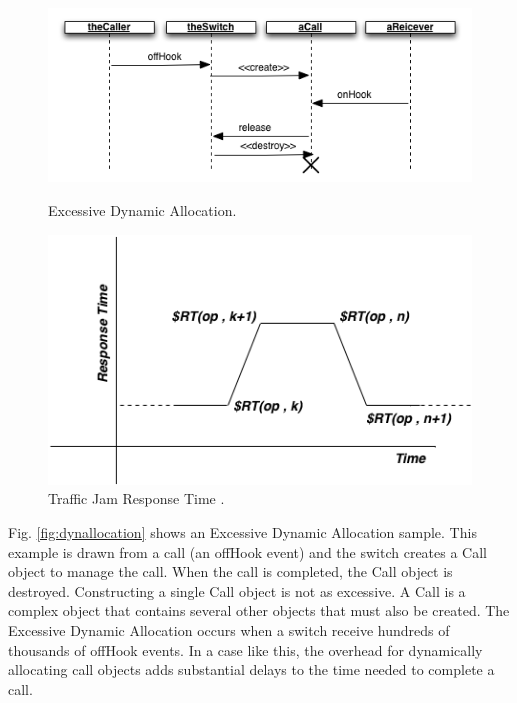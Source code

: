 \documentclass[espaco=umemeio,chapter=TITLE,twoside,openright]{abnt}
\begin{document}
\begin{figure}[h]
\begin{minipage}{.5\textwidth}
\centering
\includegraphics[width=1\textwidth]{./images/excessivedynamicallocation.png}
\caption{Excessive Dynamic Allocation.}
\label{fig:dynallocation}
\end{minipage}
\begin{minipage}{.5\textwidth}
\centering
\includegraphics[width=1\textwidth]{./images/jam.png}
\caption{Traffic Jam Response Time \cite{Vetoio2011}.}
\label{fig:jam}
\end{minipage}
\end{figure}

Fig. \ref{fig:dynallocation} shows an Excessive Dynamic Allocation sample. This example is drawn from a call (an offHook event) and the switch creates a Call object to manage the call. When the call is completed, the Call object is destroyed. Constructing a single Call object is not as excessive. A Call is a complex object that contains several other objects that must also be created. The Excessive Dynamic Allocation occurs when  a switch receive hundreds of thousands of offHook events. In a case like this, the overhead for dynamically allocating call objects adds substantial delays to the time needed to complete a call.
\end{document}
